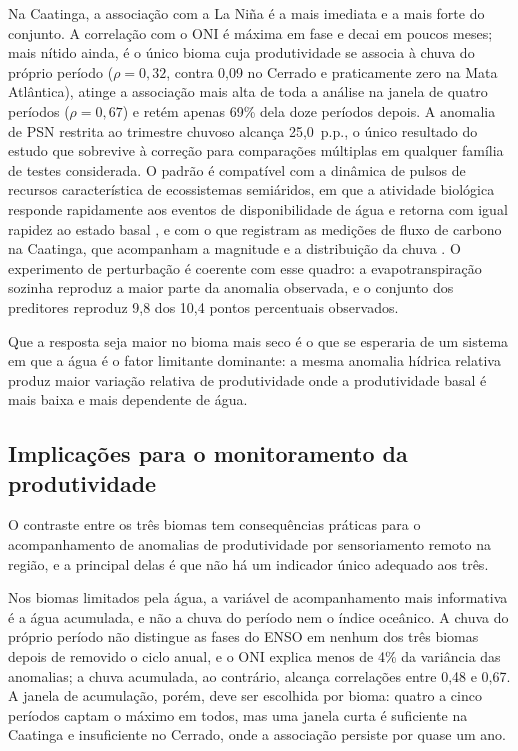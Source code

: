 \documentclass[a4paper,fleqn]{cas-sc}
\begin{document}
Na Caatinga, a associação com a La Niña é a mais imediata e a mais forte do conjunto. A correlação com o ONI é máxima em fase e decai em poucos meses; mais nítido ainda, é o único bioma cuja produtividade se associa à chuva do próprio período ($\rho = 0{,}32$, contra 0,09 no Cerrado e praticamente zero na Mata Atlântica), atinge a associação mais alta de toda a análise na janela de quatro períodos ($\rho = 0{,}67$) e retém apenas 69\% dela doze períodos depois. A anomalia de PSN restrita ao trimestre chuvoso alcança 25,0~p.p., o único resultado do estudo que sobrevive à correção para comparações múltiplas em qualquer família de testes considerada. O padrão é compatível com a dinâmica de pulsos de recursos característica de ecossistemas semiáridos, em que a atividade biológica responde rapidamente aos eventos de disponibilidade de água e retorna com igual rapidez ao estado basal \citep{schwinning2004}, e com o que registram as medições de fluxo de carbono na Caatinga, que acompanham a magnitude e a distribuição da chuva \citep{mendes2020, mendes2025}. O experimento de perturbação é coerente com esse quadro: a evapotranspiração sozinha reproduz a maior parte da anomalia observada, e o conjunto dos preditores reproduz 9,8 dos 10,4 pontos percentuais observados.

Que a resposta seja maior no bioma mais seco é o que se esperaria de um sistema em que a água é o fator limitante dominante: a mesma anomalia hídrica relativa produz maior variação relativa de produtividade onde a produtividade basal é mais baixa e mais dependente de água.

\subsection{Implicações para o monitoramento da produtividade}

O contraste entre os três biomas tem consequências práticas para o acompanhamento de anomalias de produtividade por sensoriamento remoto na região, e a principal delas é que não há um indicador único adequado aos três.

Nos biomas limitados pela água, a variável de acompanhamento mais informativa é a água acumulada, e não a chuva do período nem o índice oceânico. A chuva do próprio período não distingue as fases do ENSO em nenhum dos três biomas depois de removido o ciclo anual, e o ONI explica menos de 4\% da variância das anomalias; a chuva acumulada, ao contrário, alcança correlações entre 0,48 e 0,67. A janela de acumulação, porém, deve ser escolhida por bioma: quatro a cinco períodos captam o máximo em todos, mas uma janela curta é suficiente na Caatinga e insuficiente no Cerrado, onde a associação persiste por quase um ano.
\end{document}
